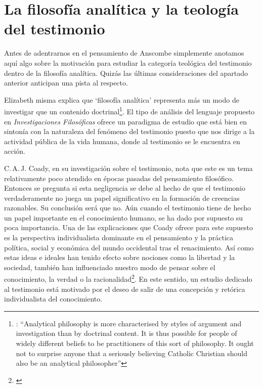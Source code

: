 \section{La filosofía analítica y la teología del testimonio}

Antes de adentrarnos en el pensamiento de Anscombe simplemente anotamos aquí algo sobre la motivación para estudiar la categoría teológica del testimonio dentro de la filosofía analítica. Quizás las últimas consideraciones del apartado anterior anticipan una pista al respecto.

Elizabeth misma explica que `filosofía analítica' representa más un modo de investigar que un contenido doctrinal\footnote{\cite[66]{anscombe2008faith:twenty}: \enquote{Analytical philosophy is more characterised by styles of argument and investigation than by doctrinal content. It is thus possible for people of widely different beliefs to be practitioners of this sort of philosophy. It ought not to surprise anyone that a seriously believing Catholic Christian should also be an analytical philosopher}}. El tipo de análisis del lenguaje propuesto en \emph{Investigaciones Filosóficas} ofrece un paradigma de estudio que está bien en sintonía con la naturaleza del fenómeno del testimonio puesto que nos dirige a la actividad pública de la vida humana, donde al testimonio se le encuentra en acción.

C.\,A.\,J. Coady, en su investigación sobre el testimonio, nota que este es un tema relativamente poco atendido en épocas pasadas del pensamiento filosófico. Entonces se pregunta si esta negligencia se debe al hecho de que el testimonio verdaderamente no juega un papel significativo en la formación de creencias razonables. Su conclusión será que no. Aún cuando el testimonio tiene de hecho un papel importante en el conocimiento humano, se ha dado por supuesto su poca importancia. Una de las explicaciones que Coady ofrece para este supuesto es la perspectiva individualista dominante en el pensamiento y la práctica política, social y económica del mundo occidental tras el renacimiento. Así como estas ideas e ideales han tenido efecto sobre nociones como la libertad y la sociedad, también han influenciado nuestro modo de pensar sobre el conocimiento, la verdad o la racionalidad\footnote{\cite[Cf.~][6-13]{coady1992test}}. En este sentido, un estudio dedicado al testimonio está motivado por el deseo de salir de una concepción y retórica individualista del conocimiento.

